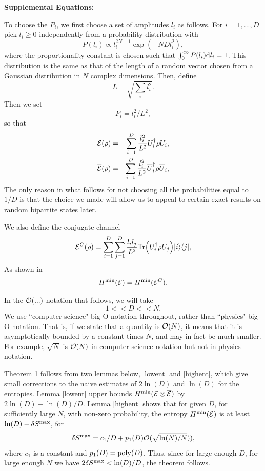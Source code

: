 \documentclass[aps,prl,amsmath,amssymb,amsfonts,superscriptaddress,floatfix]{revtex4}
\newcommand{\dSm}{\delta S^{\rm max}}
\newcommand{\conc}{{\cal E}^C}
\newcommand{\be}{\begin{equation}}
\newcommand{\ee}{\end{equation}}
\begin{document}
\newpage
{\bf Supplemental Equations:}

To choose the $P_i$, we first choose a set of amplitudes $l_i$ as follows.
For $i=1,...,D$ pick $l_i\geq 0$ independently
from a probability distribution with
\be
\label{rdist}
P(l_i) \propto l_i^{2N-1} \exp(-NDl_i^2),
\ee
where the proportionality constant is chosen such that $\int_0^{\infty} P(l_i)
{\rm d}l_i=1$.  This distribution is the same as that of the length of
a random vector chosen from a Gaussian distribution in $N$ complex dimensions.
Then, define
\be
L=\sqrt{\sum_i l_i^2}.
\ee
Then we set
\be
P_i=l_i^2/L^2,
\ee
so that
\begin{eqnarray}
\label{echannel}
{\cal E}(\rho)&=&
\sum_{i=1}^D 
\frac{l_i^2}{L^2}
U^{\dagger}_i \rho U_i,
\\ \nonumber
\overline {\cal E}(\rho)&=&
\sum_{i=1}^D 
\frac{l_i^2}{L^2}
\overline U^{\dagger}_i \rho \overline U_i,
\end{eqnarray}
The only reason
in what follows for not choosing all the probabilities equal to $1/D$
is that the choice we made will allow us to appeal to certain exact results
on random bipartite states later.

We also define the conjugate channel
\be
\label{ccd}
\conc(\rho)=\sum_{i=1}^D \sum_{j=1}^D
\frac{l_i l_j}{L^2}{\rm Tr}\Bigl(U^{\dagger}_i \rho U_j\Bigr)
|i\rangle\langle j|,
\ee
As shown in \cite{cc}
\be
H^{\rm min}({\cal E})=H^{\rm min}(\conc).
\ee

In the ${\cal O}(...)$ notation that follows, we will take
\be
1<<D<<N.
\ee
We use ``computer science" big-O notation throughout, rather than ``physics"
big-O notation.  That is, if we state that a quantity is ${\cal O}(N)$, it
means that it is asymptotically bounded by a constant times $N$, and
may in fact be much smaller.  For example, $\sqrt{N}$ is ${\cal O}(N)$
in computer science notation but not in physics notation.

Theorem 1
follows from two lemmas below, \ref{lowent} and
\ref{highent}, which give small corrections to the naive estimates
of $2\ln(D)$ and $\ln(D)$
for the entropies.  Lemma \ref{lowent} upper bounds
$H^{\rm min}({\cal E}\otimes \overline {\cal E})$ by
$2\ln(D)-\ln(D)/D$.  Lemma \ref{highent}
shows that for given $D$, for sufficiently large
$N$, with non-zero probability, the
entropy
$H^{\rm min}({\cal E})$ is at least 
$\ln(D)-\dSm$, for
\be
\dSm=c_1/D
+p_1(D){\cal O}(\sqrt{\ln(N)/N})),
\ee
where $c_1$ is a constant and $p_1(D)={\rm poly}(D)$.
Thus, since for large enough $D$, for large enough $N$ we have
$2\dSm< \ln(D)/D$, the theorem follows.
\end{document}
